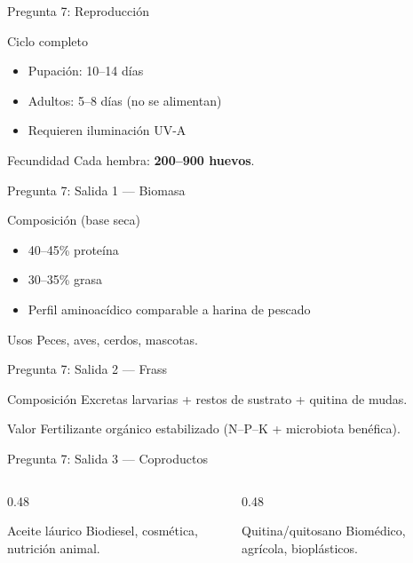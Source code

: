 \documentclass[aspectratio=169, 11pt]{beamer}
\begin{document}
\begin{frame}{Pregunta 7: Reproducción}
\begin{block}{Ciclo completo}
\footnotesize
\begin{itemize}
    \item Pupación: 10--14 días
    \item Adultos: 5--8 días (no se alimentan)
    \item Requieren iluminación UV-A
\end{itemize}
\end{block}
\begin{exampleblock}{Fecundidad}
\footnotesize
Cada hembra: \textbf{200--900 huevos}.
\end{exampleblock}
\end{frame}

\begin{frame}{Pregunta 7: Salida 1 --- Biomasa}
\begin{block}{Composición (base seca)}
\footnotesize
\begin{itemize}
    \item 40--45\% proteína
    \item 30--35\% grasa
    \item Perfil aminoacídico comparable a harina de pescado
\end{itemize}
\end{block}
\begin{exampleblock}{Usos}
\footnotesize
Peces, aves, cerdos, mascotas.
\end{exampleblock}
\end{frame}

\begin{frame}{Pregunta 7: Salida 2 --- Frass}
\begin{block}{Composición}
\footnotesize
Excretas larvarias + restos de sustrato + quitina de mudas.
\end{block}
\begin{exampleblock}{Valor}
\footnotesize
Fertilizante orgánico estabilizado (N--P--K + microbiota benéfica).
\end{exampleblock}
\end{frame}

\begin{frame}{Pregunta 7: Salida 3 --- Coproductos}
\begin{columns}[T]
\begin{column}{0.48\textwidth}
\begin{block}{Aceite láurico}
\footnotesize
Biodiesel, cosmética, nutrición animal.
\end{block}
\end{column}
\begin{column}{0.48\textwidth}
\begin{exampleblock}{Quitina/quitosano}
\footnotesize
Biomédico, agrícola, bioplásticos.
\end{exampleblock}
\end{column}
\end{columns}
\end{frame}
\end{document}

